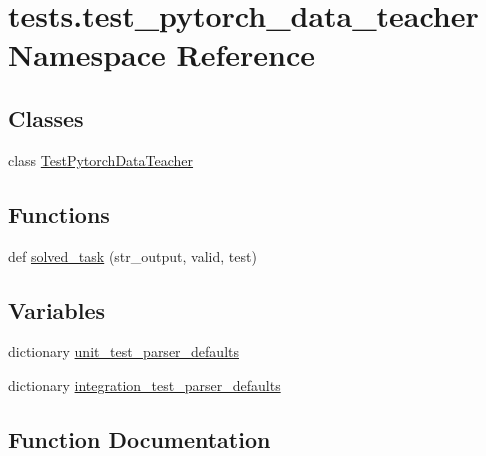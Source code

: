 \hypertarget{namespacetests_1_1test__pytorch__data__teacher}{}\section{tests.\+test\+\_\+pytorch\+\_\+data\+\_\+teacher Namespace Reference}
\label{namespacetests_1_1test__pytorch__data__teacher}
\subsection*{Classes}
\begin{DoxyCompactItemize}
\item 
class \hyperlink{classtests_1_1test__pytorch__data__teacher_1_1TestPytorchDataTeacher}{Test\+Pytorch\+Data\+Teacher}
\end{DoxyCompactItemize}
\subsection*{Functions}
\begin{DoxyCompactItemize}
\item 
def \hyperlink{namespacetests_1_1test__pytorch__data__teacher_a5511223c74b5eca00f42d68488ea101e}{solved\+\_\+task} (str\+\_\+output, valid, test)
\end{DoxyCompactItemize}
\subsection*{Variables}
\begin{DoxyCompactItemize}
\item 
dictionary \hyperlink{namespacetests_1_1test__pytorch__data__teacher_a20b08dfc55904cf898ea79dec26a4a52}{unit\+\_\+test\+\_\+parser\+\_\+defaults}
\item 
dictionary \hyperlink{namespacetests_1_1test__pytorch__data__teacher_a67fc6778f807763cafa81fc964510567}{integration\+\_\+test\+\_\+parser\+\_\+defaults}
\end{DoxyCompactItemize}


\subsection{Function Documentation}
\mbox{\label{namespacetests_1_1test__pytorch__data__teacher_a5511223c74b5eca00f42d68488ea101e}} 
